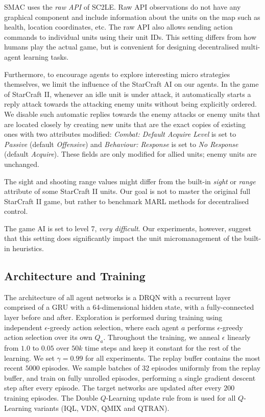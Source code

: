 \documentclass[twoside,11pt]{article}
\begin{document}
SMAC uses the \textit{raw API} of SC2LE. Raw API observations do not have any graphical component and include information about the units on the map such as health, location coordinates, etc. The raw API also allows sending action commands to individual units using their unit IDs. This setting differs from how humans play the actual game, but is convenient for designing decentralised multi-agent learning tasks. 


Furthermore, to encourage agents to explore interesting micro strategies themselves, we limit the influence of the StarCraft AI on our agents. 
In the game of StarCraft II, whenever an idle unit is under attack, it automatically starts a reply attack towards the attacking enemy units without being explicitly ordered. We disable such automatic replies towards the enemy attacks or enemy units that are located closely by creating new units that are the exact copies of existing ones with two attributes modified: \textit{Combat: Default Acquire Level} is set to \textit{Passive} (default \textit{Offensive}) and \textit{Behaviour: Response} is set to \textit{No Response} (default \textit{Acquire}). These fields are only modified for allied units; enemy units are unchanged.

The sight and shooting range values might differ from the built-in \textit{sight} or \textit{range} attribute of some StarCraft II units. Our goal is not to master the original full StarCraft II game, but rather to benchmark MARL methods for decentralised control.

The game AI is set to level 7, \textit{very difficult}. Our experiments, however, suggest that this setting does significantly impact the unit micromanagement of the built-in heuristics.

\subsection{Architecture and Training}
\label{sec:smac_setup}

The architecture of all agent networks is a DRQN with a recurrent layer 
comprised of a GRU with a 64-dimensional hidden state, with a fully-connected 
layer before and after.
Exploration is performed during training using independent $\epsilon$-greedy action selection, where each agent $a$ performs $\epsilon$-greedy action selection over its own $Q_a$. 
Throughout the training, we anneal $\epsilon$ linearly from $1.0$ to $0.05$ over $50k$ time steps and keep it constant for the rest of the learning. 
We set $\gamma = 0.99$ for all experiments.
The replay buffer contains the most recent $5000$ episodes.  
We sample batches of 32 episodes uniformly from the replay buffer, and train on fully unrolled episodes, performing a single gradient descent step after every episode.
The target networks are updated after every $200$ training episodes.
The Double $Q$-Learning update rule from \citep{van2016deep} is used for all $Q$-Learning variants (IQL, VDN, QMIX and QTRAN).
\end{document}
